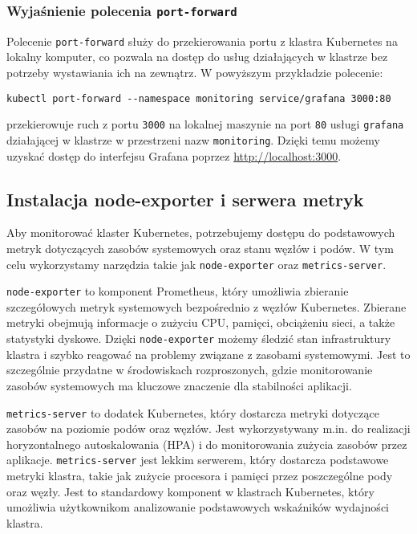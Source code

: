\documentclass{article}
\begin{document}
\subsubsection{Wyjaśnienie polecenia \texttt{port-forward}}
Polecenie \texttt{port-forward} służy do przekierowania portu z klastra Kubernetes na lokalny komputer, co pozwala na dostęp do usług działających w klastrze bez potrzeby wystawiania ich na zewnątrz. W powyższym przykładzie polecenie:
\begin{lstlisting}
kubectl port-forward --namespace monitoring service/grafana 3000:80
\end{lstlisting}
przekierowuje ruch z portu \texttt{3000} na lokalnej maszynie na port \texttt{80} usługi \texttt{grafana} działającej w klastrze w przestrzeni nazw \texttt{monitoring}. Dzięki temu możemy uzyskać dostęp do interfejsu Grafana poprzez \url{http://localhost:3000}.

\subsection{Instalacja node-exporter i serwera metryk}

Aby monitorować klaster Kubernetes, potrzebujemy dostępu do podstawowych metryk dotyczących zasobów systemowych oraz stanu węzłów i podów. W tym celu wykorzystamy narzędzia takie jak \texttt{node-exporter} oraz \texttt{metrics-server}.

\texttt{node-exporter} to komponent Prometheus, który umożliwia zbieranie szczegółowych metryk systemowych bezpośrednio z węzłów Kubernetes. Zbierane metryki obejmują informacje o zużyciu CPU, pamięci, obciążeniu sieci, a także statystyki dyskowe. Dzięki \texttt{node-exporter} możemy śledzić stan infrastruktury klastra i szybko reagować na problemy związane z zasobami systemowymi. Jest to szczególnie przydatne w środowiskach rozproszonych, gdzie monitorowanie zasobów systemowych ma kluczowe znaczenie dla stabilności aplikacji.

\texttt{metrics-server} to dodatek Kubernetes, który dostarcza metryki dotyczące zasobów na poziomie podów oraz węzłów. Jest wykorzystywany m.in. do realizacji horyzontalnego autoskalowania (HPA) i do monitorowania zużycia zasobów przez aplikacje. \texttt{metrics-server} jest lekkim serwerem, który dostarcza podstawowe metryki klastra, takie jak zużycie procesora i pamięci przez poszczególne pody oraz węzły. Jest to standardowy komponent w klastrach Kubernetes, który umożliwia użytkownikom analizowanie podstawowych wskaźników wydajności klastra.
\end{document}
